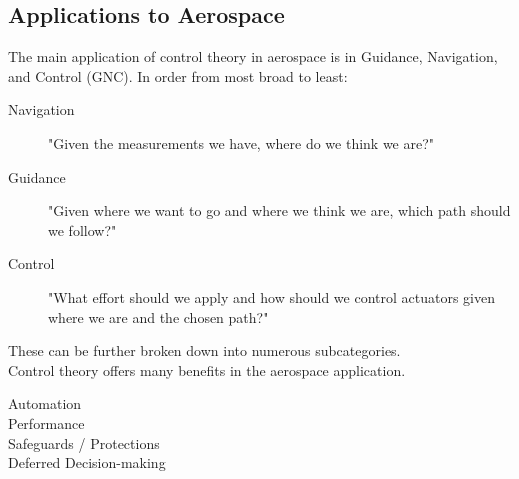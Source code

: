 \documentclass[../notes.tex]{subfiles}
\begin{document}
\subsection{Applications to Aerospace}
The main application of control theory in aerospace is in Guidance, Navigation, and Control (GNC). In order from most broad to least:
\begin{description}
    \item[Navigation] "Given the measurements we have, where do we think we are?"
    \item[Guidance] "Given where we want to go and where we think we are, which path should we follow?"
    \item[Control] "What effort should we apply and how should we control actuators given where we are and the chosen path?"
\end{description}
These can be further broken down into numerous subcategories.\\ 
Control theory offers many benefits in the aerospace application. 
\begin{description}
    \item[Automation]
    \item[Performance]
    \item[Safeguards / Protections]
    \item[Deferred Decision-making]    
\end{description}
\end{document}
